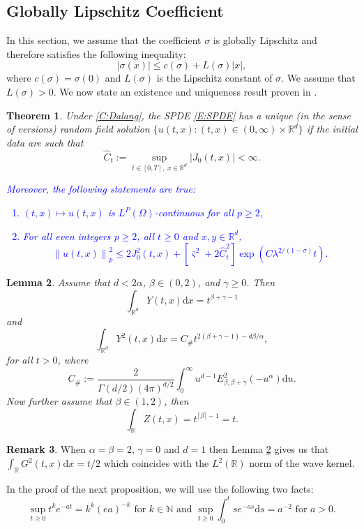 \documentclass[a4paper,11pt]{article}
\numberwithin{equation}{section}
\theoremstyle{plain}
\newtheorem{theorem}{Theorem}[section]
\newtheorem{lemma}[theorem]{Lemma}
\theoremstyle{definition}
\newtheorem{remark}[theorem]{Remark}
\newcommand{\ud}{\ensuremath{\mathrm{d} }}
\newcommand{\Norm}[1]{\left\|  #1   \right\|}
\newcommand{\R}{\mathbb{R}}
\numberwithin{NQ}{section}
\numberwithin{LQ}{section}
\numberwithin{ZQ}{section}
\begin{document}
\subsection{Globally Lipschitz Coefficient}
In this section, we assume that the coefficient $\sigma$ is globally Lipschitz and therefore satisfies the following inequality:
	\[
		|\sigma(x)| \le c(\sigma) + L(\sigma)|x|,
	\] 
where $c(\sigma) = \sigma(0)$ and $L(\sigma)$ is the Lipschitz constant of $\sigma$. We assume that $L(\sigma)>0$. We now state an existence and uniqueness result proven in \cite{CHN19}.

	\begin{theorem}
	\label{T:SolveabilityGenLip}
Under \eqref{C:Dalang}, the SPDE \eqref{E:SPDE} has a unique (in the sense of versions) random field solution $\{u(t,x) : (t,x) \in (0,\infty) \times \R^d \}$ if the initial data are such that 
	\begin{equation}
		\hat{C}_t := \sup_{t\in[0,T],\; x\in \R^d} |J_0(t,x)| < \infty.
	\end{equation}	
\textcolor{blue}{Moreover, the following statements are true:
	\begin{enumerate}
		\item $(t,x) \mapsto u(t,x)$ is $L^P(\Omega)$-continuous for all $p \ge 2$,
		\item For all even integers $p \ge 2$, all $t \ge 0$ and $x,y\in\R^d$,
			\begin{equation}
				\Norm{u(t,x)}_p^2 \le 2J_0^2(t,x) + \left[ \bar{\varsigma}^2 + 2 \hat{C}_t^2 \right]\exp(C \lambda^{2/(1-\sigma)}t).
			\end{equation}
\end{enumerate}}
	
\end{theorem}
	\begin{lemma}{\normalfont \cite[Theorem 4.1 and Lemma 5.5]{CHN19}}
	\label{L:1and2normYZ}
Assume that $d < 2\alpha$, $\beta \in (0,2)$, and $\gamma \ge 0$. Then 
	\[
		\int_{\R^d} Y(t,x) \ud x = t^{\beta+\gamma -1 }
	\]
and
	\[
		\int_{\R^d} Y^2(t,x) \ud x = C_{\#} t^{2(\beta+\gamma-1)-d\beta/\alpha},
	\]
for all $t > 0$, where 
	\[
		C_{\#} := \frac{2}{\Gamma(d/2)(4 \pi )^{d/2}} \int_0^\infty u^{d-1}E^2_{\beta,\beta + \gamma}(-u^\alpha) \ud u.
	\]
Now further assume that $\beta \in (1,2)$, then 
	\[
		\int_{\R} Z(t,x) = t^{\lceil \beta \rceil -1} = t. 
	\]
	\end{lemma}
	\begin{remark}
When $\alpha = \beta = 2$,  $\gamma = 0$ and $d=1$ then Lemma \ref{L:1and2normYZ} gives us that $\int_{\R} G^2(t,x) \ud x = t/2$ which coincides with the $L^2(\R)$ norm of the wave kernel. 
	\end{remark}
In the proof of the next proposition, we will use the following two facts:
	\begin{equation}
	\label{E:SUPidentities}
		\sup_{t\ge0} t^ke^{-at} = k^k(ea)^{-k} \text{ for }k \in \mathbb{N} \text{ and } \sup_{t \ge 0} \int_0^t s e^{-as} \ud s = a^{-2} \text{ for } a>0.
	\end{equation}
	
\end{document}
